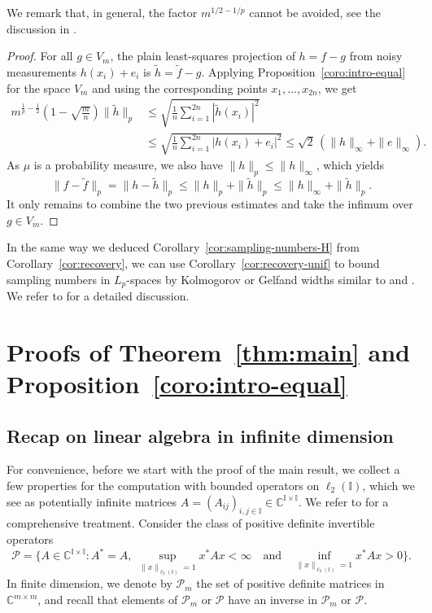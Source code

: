 \documentclass[a4paper,11pt]{article}
\renewcommand{\(}{\left (}
\renewcommand{\)}{\right )}
\newcommand{\<}{\langle}
\renewcommand{\>}{\rangle}
\newcommand{\C}{\mathbb{C}}
\newcommand{\II}{\mathbb{I}}
\theoremstyle{definition}
\begin{document}
We remark that, in general, the factor $m^{1/2-1/p}$ cannot be avoided,
see the discussion in \cite[Sec.\,5.3]{KPUU25-uniform}.


\begin{proof}
For all $g\in V_m$, the plain least-squares projection of $h=f-g$ from noisy measurements $h(x_i)+e_i$ is $\tilde h=\tilde f-g$.
Applying Proposition~\ref{coro:intro-equal} 
for the space $V_m$
and using the corresponding points $x_1,\hdots,x_{2n}$, we get
\begin{align*}
m^{\frac{1}{p}-\frac{1}{2}}\left(1-\sqrt{\frac{m}{n}}\right)\|\tilde h\|_p
&\leq \sqrt{\frac{1}{n}\sum_{i=1}^{2n} |\tilde h(x_i)|^2}\\
&\leq \sqrt{\frac{1}{n}\sum_{i=1}^{2n} |h(x_i)+e_i|^2}\leq \sqrt{2}\,(\|h\|_{\infty}+\|e\|_\infty).
\end{align*}
As $\mu$ is a probability measure, we also have $\|h\|_p\leq \|h\|_\infty$, which yields
\[
\|f-\tilde f\|_p = \|h-\tilde h\|_p \leq \|h\|_p+\|\tilde h\|_p
\leq \|h\|_\infty +\|\tilde h\|_p.
\]
It only remains to combine the two previous estimates and take the infimum over $g\in V_m$.
\end{proof}

In the same way we deduced Corollary~\ref{cor:sampling-numbers-H} from Corollary~\ref{cor:recovery}, we can use Corollary~\ref{cor:recovery-unif} to bound sampling numbers in $L_p$-spaces by Kolmogorov or Gelfand widths similar to \cite[Remark 1.5]{ChkifaDolbeault24} and \cite[Theorem 6]{KPUU}. We refer to \cite[Sec.\,3.2]{KU-acta} for a detailed discussion. 




\section{Proofs of Theorem~\ref{thm:main} and Proposition~\ref{coro:intro-equal}}
\label{sec:proof}

\subsection{Recap on linear algebra in infinite dimension}


For convenience, before we start with the proof of the main result,
we collect a few properties for the computation with bounded operators on $\ell_2(\II)$, which we see as potentially infinite matrices $A = (A_{ij})_{i,j \in \II} \in \C^{\II \times \II}$.
We refer to \cite[Chapter VI]{reed} for a comprehensive treatment.
Consider the class of
positive definite invertible operators
\[
\mathcal P=\Big\{A\in\C^{\II \times \II}\colon A^*=A,\;\sup_{\|x\|_{\ell_2(\II)}=1} x^*Ax< \infty\quad\text{and}\quad \inf_{\|x\|_{\ell_2(\II)}=1} x^*Ax>0\Big\}.
\] 
In finite dimension, we denote by $\mathcal P_m$ the set of positive definite matrices in $\C^{m\times m}$, and recall that elements of $\mathcal P_m$ or $\mathcal P$ have an inverse in $\mathcal P_m$ or $\mathcal P$.
\end{document}
